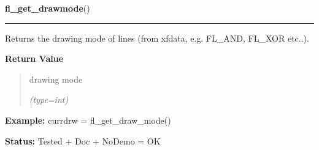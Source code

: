    \label{xformslib:flxbasic:fl_get_drawmode}

    \vspace{0.5ex}

\hspace{.8\funcindent}\begin{boxedminipage}{\funcwidth}

    \raggedright \textbf{fl\_get\_drawmode}()

    \vspace{-1.5ex}

    \rule{\textwidth}{0.5\fboxrule}
\setlength{\parskip}{2ex}
    Returns the drawing mode of lines (from xfdata, e.g. FL\_AND, FL\_XOR 
    etc..).

\setlength{\parskip}{1ex}
      \textbf{Return Value}
    \vspace{-1ex}

      \begin{quote}
      drawing mode

      {\it (type=int)}

      \end{quote}

\textbf{Example:} currdrw = fl\_get\_draw\_mode()



\textbf{Status:} Tested + Doc + NoDemo = OK



    \end{boxedminipage}

    \label{xformslib:flxbasic:fl_drawmode}

    \vspace{0.5ex}

